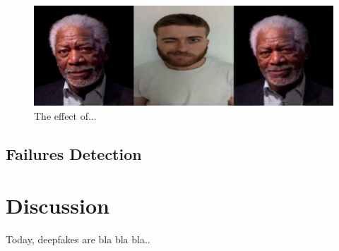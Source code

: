 \documentclass[english,12pt]{article}
\begin{document}
\begin{figure}[htb]
  \begin{centering}
      \includegraphics[scale=0.25]{images/Oren_wink_freeman.PNG}
  \par\end{centering}
  \caption{\label{fig:Oren_wink_freeman}The effect of...}
\end{figure}

\pagebreak{}

\subsection{Failures Detection}



\section{Discussion} \label{discussion}

Today, deepfakes are bla bla bla..

\pagebreak{}




\end{document}
